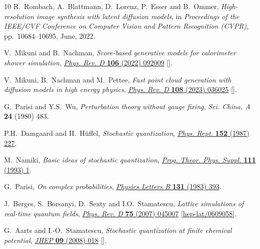 \begin{thebibliography}{10}
R.~Rombach, A.~Blattmann, D.~Lorenz, P.~Esser and B.~Ommer,
  \emph{High-resolution image synthesis with latent diffusion models},  in
  \emph{Proceedings of the IEEE/CVF Conference on Computer Vision and Pattern
  Recognition (CVPR)}, pp.~10684--10695, June, 2022.

V.~Mikuni and B.~Nachman, \emph{{Score-based generative models for calorimeter
  shower simulation}},
  \href{https://doi.org/10.1103/PhysRevD.106.092009}{\emph{Phys. Rev. D}
  {\bfseries 106} (2022) 092009}
  [\href{https://arxiv.org/abs/2206.11898}{{}}].

V.~Mikuni, B.~Nachman and M.~Pettee, \emph{{Fast point cloud generation with
  diffusion models in high energy physics}},
  \href{https://doi.org/10.1103/PhysRevD.108.036025}{\emph{Phys. Rev. D}
  {\bfseries 108} (2023) 036025}
  [\href{https://arxiv.org/abs/2304.01266}{{}}].

G.~Parisi and Y.S.~Wu, \emph{{Perturbation theory without gauge fixing}},
  {\emph{Sci. China, A} {\bfseries 24} (1980) 483}.

P.H.~Damgaard and H.~H{\"u}ffel, \emph{Stochastic quantization},
  \href{https://doi.org/10.1016/0370-1573(87)90144-X}{\emph{Phys. Rept.}
  {\bfseries 152} (1987) 227}.

M.~Namiki, \emph{{Basic ideas of stochastic quantization}},
  \href{https://doi.org/10.1143/PTPS.111.1}{\emph{Prog. Theor. Phys. Suppl.}
  {\bfseries 111} (1993) 1}.

G.~Parisi, \emph{On complex probabilities},
  \href{https://doi.org/10.1016/0370-2693(83)90525-7}{\emph{Physics Letters B}
  {\bfseries 131} (1983) 393}.

J.~Berges, S.~Borsanyi, D.~Sexty and I.O.~Stamatescu, \emph{{Lattice
  simulations of real-time quantum fields}},
  \href{https://doi.org/10.1103/PhysRevD.75.045007}{\emph{Phys. Rev. D}
  {\bfseries 75} (2007) 045007}
  [\href{https://arxiv.org/abs/hep-lat/0609058}{{\ttfamily hep-lat/0609058}}].

G.~Aarts and I.-O.~Stamatescu, \emph{{Stochastic quantization at finite
  chemical potential}},
  \href{https://doi.org/10.1088/1126-6708/2008/09/018}{\emph{JHEP} {\bfseries
  09} (2008) 018} [\href{https://arxiv.org/abs/0807.1597}{{}}].


\end{thebibliography}

